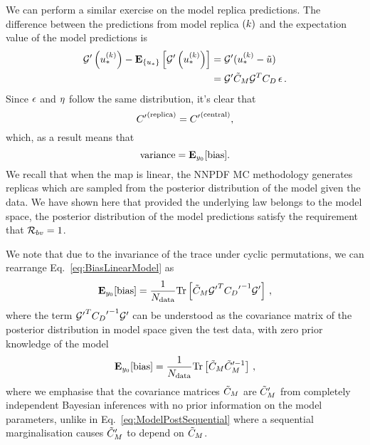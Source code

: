 We can perform a similar exercise on the model replica predictions. The difference
between the predictions from model replica $(k)$ and the expectation value
of the model predictions is
\begin{equation}
    \begin{split}
        {{\mathcal{G}}^{\prime}}\left(u_*^{(k)}\right) -
        \mathbf{E}_{\{ u_* \}} \left[ {{\mathcal{G}}^{\prime}}\left(u_*^{(k)}\right) \right] &=
        {{\mathcal{G}}^{\prime}} (u_*^{(k)} - \tilde{u}) \\
        &= {{\mathcal{G}}^{\prime}} \tilde{C}_M \mathcal{G}^T C_{D} \, \epsilon \, .
    \end{split}
\end{equation}
Since $\epsilon$ and $\eta$ follow the same distribution, it's clear that
\begin{equation}
    {{C}^{\prime}}^{(\rm replica)} = {{C}^{\prime}}^{(\rm central)},
\end{equation}
which, as a result means that
\begin{equation}
    {\rm variance} = \mathbf{E}_{y_0}[{\rm bias}].
\end{equation}
We recall that when the map is linear, the NNPDF MC methodology generates replicas
which are sampled from the posterior distribution of the model given the data.
We have shown here that provided the underlying law belongs to the model
space, the posterior distribution of the model predictions satisfy the
requirement that $\mathcal{R}_{bv} = 1$.

We note that due to the invariance of the trace under cyclic permutations, we
can rearrange Eq.~\ref{eq:BiasLinearModel} as
\begin{equation}
    \mathbf{E}_{y_0}[{\rm bias}] = \frac{1}{N_{\rm data}}
    {\rm Tr} \left[
        \tilde{C}_M
        {{\mathcal{G}}^{\prime}}^T {{C_{D}}^{\prime}}^{-1} {{\mathcal{G}}^{\prime}}
    \right] \, ,
\end{equation}
where the term ${{\mathcal{G}}^{\prime}}^T {{C_{D}}^{\prime}}^{-1} {{\mathcal{G}}^{\prime}}$
can be understood as the covariance matrix of the posterior distribution in model
space given the test data, with zero prior knowledge of the model \viz
\begin{equation}\label{eq:BiasTraceModelPost}
    \mathbf{E}_{y_0}[{\rm bias}] = \frac{1}{N_{\rm data}}
    {\rm Tr} \left[ \tilde{C}_M {\tilde{C}_M}^{ \prime -1} \right] \, ,
\end{equation}
where we emphasise that the covariance matrices $\tilde{C}_M$ are
${{\tilde{C}_M}^{\prime}}$ from completely independent Bayesian inferences
with no prior information on the model parameters, unlike in
Eq.~\ref{eq:ModelPostSequential} where a sequential marginalisation causes
${{\tilde{C}_M}^{\prime}}$ to depend on $\tilde{C}_M$.

